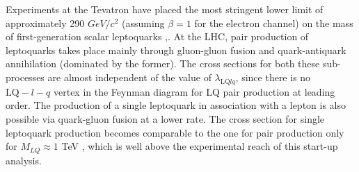 %

Experiments at the Tevatron have placed the most stringent lower 
limit of approximately 290 $GeV/c^2$ (assuming $\beta=1$ for the electron channel) 
on the mass of first-generation scalar leptoquarks \cite{d02008},\cite{Acosta:2005ge}.
At the LHC, pair production of leptoquarks takes place 
mainly through gluon-gluon fusion and 
quark-antiquark annihilation (dominated by the former). 
The cross sections for both these sub-processes are almost 
independent of the value of 
$\lambda_{\mbox{LQ}lq}$, since there is 
no $\mbox{LQ}-l-q$ vertex in the Feynman diagram for LQ pair production 
at leading order. 
The production of a single leptoquark in association with a lepton 
is also possible via quark-gluon 
fusion at a lower rate. 
The cross section for single leptoquark production
becomes comparable to the one for pair production only 
for $M_{LQ}\approx 1$ TeV \cite{Belyaev:2005ew}, 
which is well above the experimental reach of this start-up analysis.  

%

